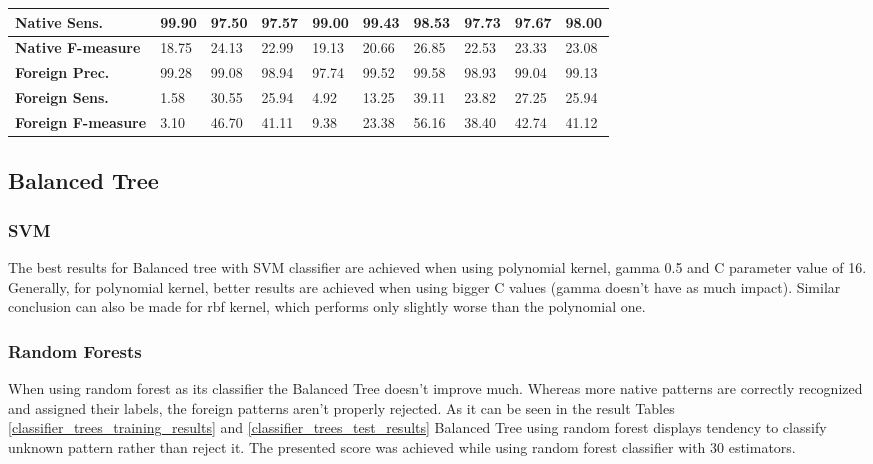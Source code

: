 \begin{table}[htp]
{\begin{tabular}{l|l|l|l|l|l|l|l|l|l|}
			\multicolumn{1}{|l|}{\textbf{Native Sens.}}        & 99.90         & 97.50         & 97.57       & 99.00         & 99.43         & 98.53       & 97.73          & 97.67         & 98.00        \\ \hline
			\multicolumn{1}{|l|}{\textbf{Native F-measure}}          & 18.75         & 24.13         & 22.99       & 19.13         & 20.66         & 26.85       & 22.53          & 23.33         & 23.08        \\ \hline
			\multicolumn{1}{|l|}{\textbf{Foreign Prec.}}         & 99.28         & 99.08         & 98.94       & 97.74         & 99.52         & 99.58       & 98.93          & 99.04         & 99.13        \\ \hline
			\multicolumn{1}{|l|}{\textbf{Foreign Sens.}}       & 1.58          & 30.55         & 25.94       & 4.92          & 13.25         & 39.11       & 23.82          & 27.25         & 25.94        \\ \hline
			\multicolumn{1}{|l|}{\textbf{Foreign F-measure}}         & 3.10          & 46.70         & 41.11       & 9.38          & 23.38         & 56.16       & 38.40          & 42.74         & 41.12        \\ \hline
		\end{tabular}
	}
\end{table}

\subsection{Balanced Tree}

\subsubsection{SVM}

The best results for Balanced tree with SVM classifier are achieved when using polynomial kernel, gamma 0.5 and C parameter value of 16. Generally, for polynomial kernel, better results are achieved when using bigger C values (gamma doesn't have as much impact). Similar conclusion can also be made for rbf kernel, which performs only slightly worse than the polynomial one.

\subsubsection{Random Forests}

When using random forest as its classifier the Balanced Tree doesn't improve much. Whereas more native patterns are correctly recognized and assigned their labels, the foreign patterns aren't properly rejected. As it can be seen in the result Tables \ref{classifier_trees_training_results} and \ref{classifier_trees_test_results} Balanced Tree using random forest displays tendency to classify unknown pattern rather than reject it. The presented score was achieved while using random forest classifier with 30 estimators.

